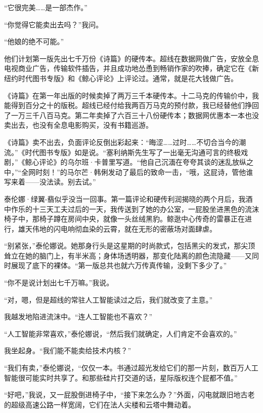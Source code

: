 \documentclass[AutoFakeBold=true]{book}
\begin{document}
``它很完美……是一部杰作。''

``你觉得它能卖出去吗？''我问。

``他娘的绝不可能。''

\vspace*{1em}

他们计划第一版先出七千万份《诗篇》的硬传本。超线在数据网做广告，安放全息电视商业广告，传输软件插告，并且成功地怂恿到畅销作家的吹捧，确定它在《新纽约时代图书专版》和《鲸心评论》上评论过。通常，就是花大钱做广告。

《诗篇》在第一年出版的时候卖掉了两万三千本硬传本。十二马克的传输价中，我能得到百分之十的版税。超线已经付给我两百万马克的预付款，我已经替他们挣回了一万三千八百马克。第二年卖掉了六百三十八份硬传本；数据网优惠本一本也没卖出去，也没有全息电影购买，没有书籍巡游。

《诗篇》卖不出去，负面评论反倒出彩起来：``晦涩……过时……不切合当今的潮流。''《时代图书专版》如是说。``塞利纳斯先生写了一出毫无沟通可言的终极戏剧，''《鲸心评论》的乌尔班·卡普里写道。``他自己沉湎在夸夸其谈的迷乱放纵之中，''``全网时刻！''的马尔芒·韩俐发动了最后的致命一击，``哦，这屁诗，管他谁写来着——没法读。别去试。''

\vspace*{1em}

泰伦娜·绿翼-翡似乎没当一回事。第一篇评论和硬传利润揭晓的两个月后，我酒中作乐的十三天工夫过后的一天，我传送到了她的办公室，一屁股坐进黑色的流沫椅子中，那椅子蹲在房间中央，就像一头丝绒黑豹。鲸逖中心传奇的雷暴正在进行，雄天伟地的闪电响彻血染的云霄，就在无形的密蔽场对面肆虐。

``别紧张，''泰伦娜说。她那身行头是这星期的时尚款式，包括黑尖的发式，那尖顶耸立在她的脑门上，有半米高；身体场透明器，那变化陆离的颜色流隐藏——又同时展现了底下的裸体。``第一版总共也就六万传真传输，没剩下多少了。''

``你不是说计划出七千万嘛。''我说。

``对，嗯，但是超线的常驻人工智能读过之后，我们就改变了主意。''

我越发地陷进流沫中。``连人工智能也不喜欢？''

``人工智能非常喜欢，''泰伦娜说，``然后我们就确定，人们肯定不会喜欢的。''

我坐起身。``我们能不能卖给技术内核？''

``我们有卖，''泰伦娜说，``仅仅一本。书通过超光发给它们的那一片刻，数百万人工智能很可能实时共享了。和那些硅片打交道的话，星际版权连个屁都不值。''

``好吧，''我说，又一屁股倒进椅子中，``接下来怎么办？''外面，闪电就跟旧地古老的超级高速公路一样宽阔，它们在法人尖楼和云塔中舞动着。
\end{document}
